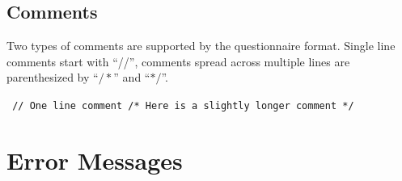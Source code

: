 \documentclass[11pt,a4paper,titlepage]{article}
\begin{document}
\subsection{Comments}

Two types of comments are supported by the questionnaire format. Single line comments start with ``//'', comments spread across multiple lines are parenthesized by ``\texttt{$/*$}'' and ``\texttt{$*/$}''.

\begin{center}
	\begin{tcolorbox}[colback=black!10!white,colframe=black!50!white, boxsep=1pt,left=4pt,right=4pt,top=4pt,bottom=2pt]
		\texttt{\noindent
			// One line comment\newline
			\newline
			/* Here is a\newline
			slightly longer\newline
			comment */
		}
	\end{tcolorbox}
\end{center}


\section{Error Messages}
\end{document}
